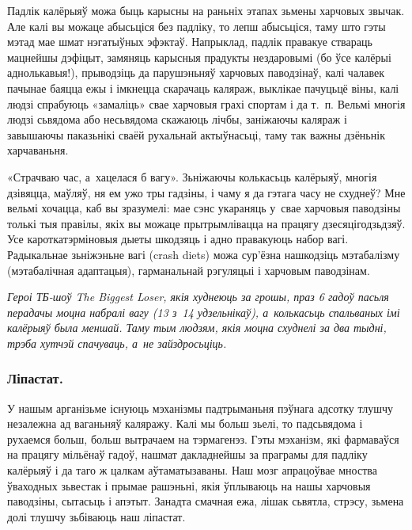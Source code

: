 Падлік калёрыяў можа быць карысны на раньніх этапах зьмены харчовых звычак. Але калі вы можаце абысьціся без падліку, то лепш абысьціся, таму што гэты мэтад мае шмат нэгатыўных эфэктаў. Напрыклад, падлік правакуе ствараць мацнейшы дэфіцыт, замяняць карысныя прадукты нездаровымі (бо ўсе калёрыі аднолькавыя!), прыводзіць да парушэньняў харчовых паводзінаў, калі чалавек пачынае баяцца ежы і імкнецца скарачаць каляраж, выклікае пачуцьцё віны, калі людзі спрабуюць «замаліць» свае харчовыя грахі спортам і да т.~п. Вельмі многія людзі сьвядома або несьвядома скажаюць лічбы, заніжаючы каляраж і завышаючы паказьнікі сваёй рухальнай актыўнасьці, таму так важны дзёньнік харчаваньня.

«Страчваю час, а~хацелася б вагу». Зьніжаючы колькасьць калёрыяў, многія дзівяцца, маўляў, ня ем ужо тры гадзіны, і чаму я да гэтага часу не схуднеў? Мне вельмі хочацца, каб вы зразумелі: мае сэнс укараняць у~свае харчовыя паводзіны толькі тыя правілы, якіх вы можаце прытрымлівацца на працягу дзесяцігодзьдзяў. Усе кароткатэрміновыя дыеты шкодзяць і адно правакуюць набор вагі. Радыкальнае зьніжэньне вагі (crash diets) можа сур'ёзна нашкодзіць мэтабалізму (мэтабалічная адаптацыя), гарманальнай рэгуляцыі і харчовым паводзінам.

\emph{Героі ТБ-шоў The Biggest Loser, якія худнеюць за грошы, праз 6 гадоў пасьля перадачы моцна набралі вагу (13 з~14 удзельнікаў), а~колькасьць спальваных імі калёрыяў была меншай. Таму тым людзям, якія моцна схуднелі за два тыдні, трэба хутчэй спачуваць, а~не зайздросьціць.}

\subsubsection{Ліпастат.}
У нашым арганізьме існуюць мэханізмы падтрыманьня пэўнага адсотку тлушчу незалежна ад ваганьняў каляражу. Калі мы больш зьелі, то падсьвядома і рухаемся больш, больш вытрачаем на тэрмагенэз. Гэты мэханізм, які фармаваўся на працягу мільёнаў гадоў, нашмат дакладнейшы за праграмы для падліку калёрыяў і да таго ж цалкам аўтаматызаваны. Наш мозг апрацоўвае мноства ўваходных зьвестак і прымае рашэньні, якія ўплываюць на нашы харчовыя паводзіны, сытасьць і апэтыт. Занадта смачная ежа, лішак сьвятла, стрэсу, зьмена долі тлушчу зьбіваюць наш ліпастат.



